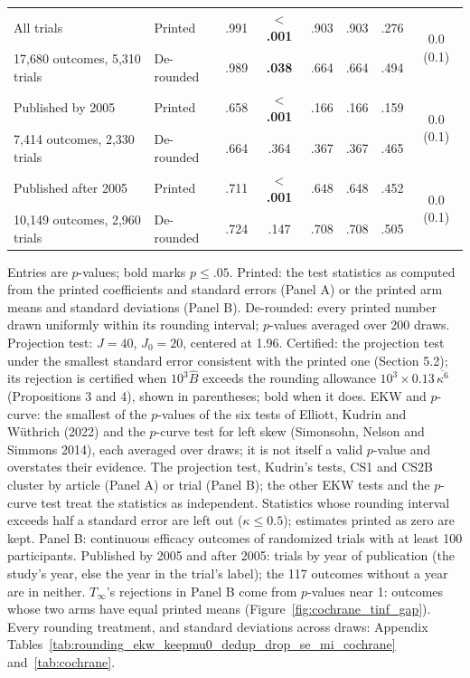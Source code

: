 \begin{table}[!htbp]
\begin{threeparttable}
\begin{tabular}{llcccccc}
All trials & Printed & .991 & \textbf{$<$.001} & .903 & .903 & .276 & \multirow{2}{*}{0.0 (0.1)} \\
{\footnotesize 17,680 outcomes, 5,310 trials} & De-rounded & .989 & \textbf{.038} & .664 & .664 & .494 & \\
\addlinespace[2pt]
Published by 2005 & Printed & .658 & \textbf{$<$.001} & .166 & .166 & .159 & \multirow{2}{*}{0.0 (0.1)} \\
{\footnotesize  7,414 outcomes, 2,330 trials} & De-rounded & .664 & .364 & .367 & .367 & .465 & \\
\addlinespace[2pt]
Published after 2005 & Printed & .711 & \textbf{$<$.001} & .648 & .648 & .452 & \multirow{2}{*}{0.0 (0.1)} \\
{\footnotesize 10,149 outcomes, 2,960 trials} & De-rounded & .724 & .147 & .708 & .708 & .505 & \\
\bottomrule
\end{tabular}
\begin{tablenotes}[flushleft]\footnotesize
\item Entries are $p$-values; bold marks $p \le .05$. Printed: the test statistics as computed from the printed coefficients and standard errors (Panel A) or the printed arm means and standard deviations (Panel B). De-rounded: every printed number drawn uniformly within its rounding interval; $p$-values averaged over 200 draws. Projection test: $J = 40$, $J_0 = 20$, centered at 1.96. Certified: the projection test under the smallest standard error consistent with the printed one (Section 5.2); its rejection is certified when $10^3 \hat B$ exceeds the rounding allowance $10^3 \times 0.13\,\overline{\kappa^6}$ (Propositions 3 and 4), shown in parentheses; bold when it does. EKW and $p$-curve: the smallest of the $p$-values of the six tests of Elliott, Kudrin and W\"uthrich (2022) and the $p$-curve test for left skew (Simonsohn, Nelson and Simmons 2014), each averaged over draws; it is not itself a valid $p$-value and overstates their evidence. The projection test, Kudrin's tests, CS1 and CS2B cluster by article (Panel A) or trial (Panel B); the other EKW tests and the $p$-curve test treat the statistics as independent. Statistics whose rounding interval exceeds half a standard error are left out ($\kappa \le 0.5$); estimates printed as zero are kept. Panel B: continuous efficacy outcomes of randomized trials with at least 100 participants. Published by 2005 and after 2005: trials by year of publication (the study's year, else the year in the trial's label); the 117 outcomes without a year are in neither. $T_\infty$'s rejections in Panel B come from $p$-values near 1: outcomes whose two arms have equal printed means (Figure~\ref{fig:cochrane_tinf_gap}). Every rounding treatment, and standard deviations across draws: Appendix Tables~\ref{tab:rounding_ekw_keepmu0_dedup_drop_se_mi_cochrane} and~\ref{tab:cochrane}.
\end{tablenotes}
\end{threeparttable}
\end{table}
